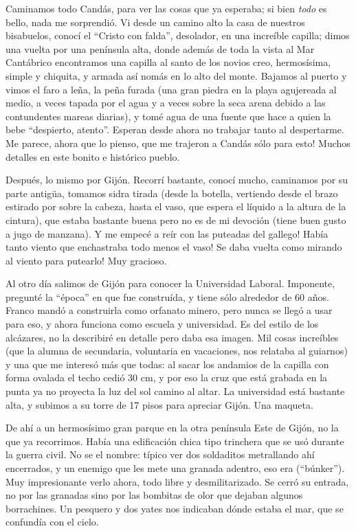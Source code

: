 Caminamos todo Cand\'as, para ver las cosas que ya esperaba; si bien
\emph{todo} es bello, nada me sorprendi\'o. Vi desde un camino alto la casa de
nuestros bisabuelos, conoc\'i el ``Cristo con falda'', desolador, en una
incre\'ible capilla; dimos una vuelta por una pen\'insula alta, donde adem\'as
de toda la vista al Mar Cant\'abrico encontramos una capilla al santo de los
novios creo, hermos\'isima, simple y chiquita, y armada as\'i nom\'as en lo
alto del monte. Bajamos al puerto y vimos el faro a le\~na, la pe\~na furada
(una gran piedra en la playa agujereada al medio, a veces tapada por el agua y a
veces sobre la seca arena debido a las contundentes mareas diarias), y tom\'e
agua de una fuente que hace a quien la bebe ``despierto, atento''. Esperan
desde ahora no trabajar tanto al despertarme. \textexclamdown Me parece, ahora
que lo pienso, que me trajeron a Cand\'as s\'olo para esto! Muchos detalles en
este bonito e hist\'orico pueblo.

Despu\'es, lo mismo por Gij\'on. Recorr\'i bastante, conoc\'i mucho, caminamos
por su parte antig\"ua, tomamos sidra tirada (desde la botella, vertiendo desde
el brazo estirado por sobre la cabeza, hasta el vaso, que espera el l\'iquido a
la altura de la cintura), que estaba bastante buena pero no es de mi devoci\'on
(tiene buen gusto a jugo de manzana). \textexclamdown Y me empec\'e a re\'ir con
las puteadas del gallego! \textexclamdown Hab\'ia tanto viento que enchastraba
todo menos el vaso! \textexclamdown Se daba vuelta como mirando al viento para
putearlo! Muy gracioso.

Al otro d\'ia salimos de Gij\'on para conocer la Universidad Laboral.
Imponente, pregunt\'e la ``\'epoca'' en que fue constru\'ida, y tiene s\'olo
alrededor de 60 a\~nos. Franco mand\'o a construirla como orfanato minero,
pero nunca se lleg\'o a usar para eso, y ahora funciona como escuela y
universidad. Es del estilo de los alc\'azares, no la describir\'e en detalle
pero daba esa imagen. Mil cosas incre\'ibles (que la alumna de secundaria,
voluntaria en vacaciones, nos relataba al guiarnos) y una que me interes\'o
m\'as que todas: al sacar los andamios de la capilla con forma ovalada el
techo cedi\'o 30 cm, y por eso la cruz que est\'a grabada en la punta ya no
proyecta la luz del sol camino al altar. La universidad est\'a bastante alta,
y subimos a su torre de 17 pisos para apreciar Gij\'on. Una maqueta.

De ah\'i a un hermos\'isimo gran parque en la otra pen\'insula Este de Gij\'on,
no la que ya recorrimos. Hab\'ia una edificaci\'on chica tipo trinchera que se
us\'o durante la guerra civil. No se el nombre: t\'ipico ver dos soldaditos
metrallando ah\'i encerrados, y un enemigo que les mete una granada adentro, eso
era (``b\'unker''). Muy impresionante verlo ahora, todo libre y
desmilitarizado. Se cerr\'o su entrada, no por las granadas sino por las
bombitas de olor que dejaban algunos borrachines. Un pesquero y dos yates nos
indicaban d\'onde estaba el mar, que se confund\'ia con el cielo.

